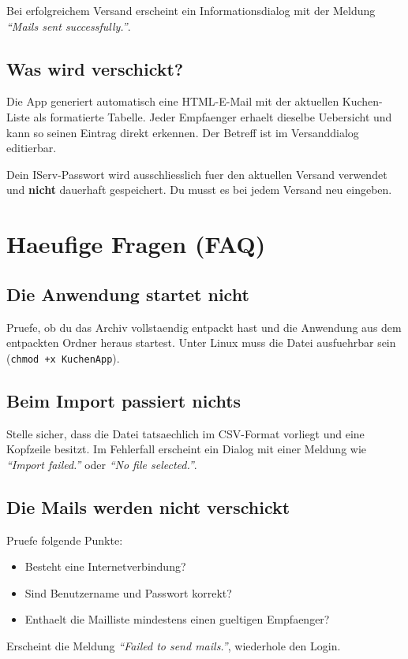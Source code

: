 \documentclass[12pt, a4paper]{article}
\begin{document}
\begin{successbox}
Bei erfolgreichem Versand erscheint ein Informationsdialog mit der Meldung
\emph{"`Mails sent successfully."'}.
\end{successbox}

\subsection{Was wird verschickt?}

Die App generiert automatisch eine HTML-E-Mail mit der aktuellen Kuchen-Liste
als formatierte Tabelle. Jeder Empfaenger erhaelt dieselbe Uebersicht und kann
so seinen Eintrag direkt erkennen. Der Betreff ist im Versanddialog editierbar.

\begin{warnbox}
Dein IServ-Passwort wird ausschliesslich fuer den aktuellen Versand verwendet
und \textbf{nicht} dauerhaft gespeichert. Du musst es bei jedem Versand neu
eingeben.
\end{warnbox}

\section{Haeufige Fragen (FAQ)}

\subsection{Die Anwendung startet nicht}
Pruefe, ob du das Archiv vollstaendig entpackt hast und die Anwendung aus dem
entpackten Ordner heraus startest. Unter Linux muss die Datei ausfuehrbar sein
(\texttt{chmod +x KuchenApp}).

\subsection{Beim Import passiert nichts}
Stelle sicher, dass die Datei tatsaechlich im CSV-Format vorliegt und eine
Kopfzeile besitzt. Im Fehlerfall erscheint ein Dialog mit einer Meldung wie
\emph{"`Import failed."'} oder \emph{"`No file selected."'}.

\subsection{Die Mails werden nicht verschickt}
Pruefe folgende Punkte:
\begin{itemize}[leftmargin=1.5em]
    \item Besteht eine Internetverbindung?
    \item Sind Benutzername und Passwort korrekt?
    \item Enthaelt die Mailliste mindestens einen gueltigen Empfaenger?
\end{itemize}
Erscheint die Meldung \emph{"`Failed to send mails."'}, wiederhole den Login.
\end{document}
